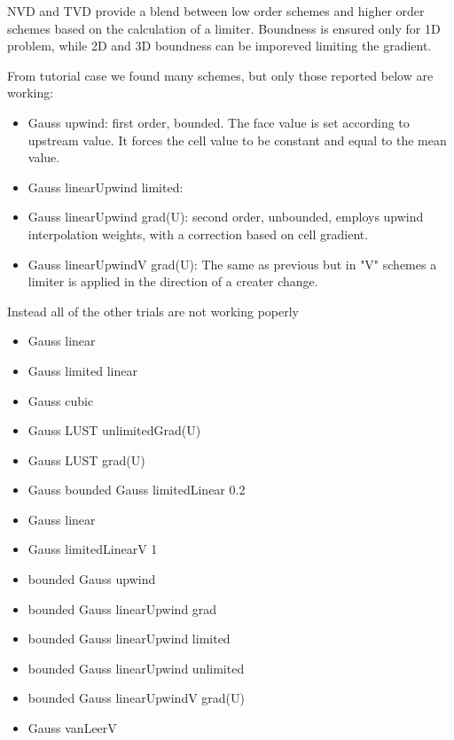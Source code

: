 \documentclass[a4paper,12pt]{article}
\begin{document}
NVD and TVD provide a blend between low order schemes and higher order schemes based on the calculation of a limiter. Boundness is ensured only for 1D problem, while 2D and 3D boundness can be imporeved limiting the gradient.

From tutorial case we found many schemes, but only those reported below are working:
\begin{itemize} 
\item {\ttfamily Gauss upwind}: first order, bounded. The face value is set according to upstream value. It forces the cell value to be constant and equal to the mean value.
 
 \item {\ttfamily Gauss linearUpwind limited}:
 
 \item {\ttfamily Gauss linearUpwind grad(U)}: second order, unbounded, employs upwind interpolation weights, with a correction based on cell gradient.
 
 \item {\ttfamily Gauss linearUpwindV grad(U)}: The same as previous but in "V" schemes a limiter is applied in the direction of a creater change.

\end{itemize} 
Instead all of the other trials are not working poperly
\begin{itemize} 

 \item {\ttfamily Gauss linear}
 \item {\ttfamily Gauss limited linear}
 \item {\ttfamily Gauss cubic}
 \item {\ttfamily Gauss LUST unlimitedGrad(U)}
 \item {\ttfamily Gauss LUST grad(U)}
 \item {\ttfamily Gauss bounded Gauss limitedLinear 0.2}
 \item {\ttfamily Gauss linear}
 \item {\ttfamily Gauss limitedLinearV 1}
 \item {\ttfamily bounded Gauss upwind}
 \item {\ttfamily bounded Gauss linearUpwind grad}
 \item {\ttfamily bounded Gauss linearUpwind limited}
 \item {\ttfamily bounded Gauss linearUpwind unlimited}
 \item {\ttfamily bounded Gauss linearUpwindV grad(U)}
 \item {\ttfamily Gauss vanLeerV}
\end{itemize} 
\end{document}
